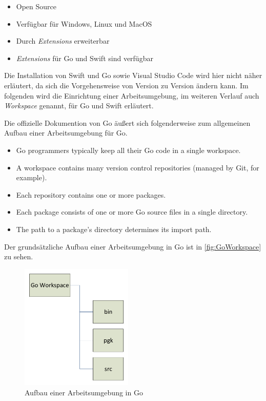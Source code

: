 \begin{itemize}
    \item Open Source
    \item Verfügbar für Windows, Linux und MacOS
    \item Durch \textit{Extensions} erweiterbar
    \item \textit{Extensions} für Go und Swift sind verfügbar
\end{itemize}

Die Installation von Swift und Go sowie Visual Studio Code wird hier nicht näher erläutert, da sich die Vorgehensweise von Version zu Version ändern kann.
Im folgenden wird die Einrichtung einer Arbeitsumgebung, im weiteren Verlauf auch \textit{Workspace} genannt, für Go und Swift erläutert.

Die offizielle Dokumention von Go \cite[]{GoDoc.Workspaces} äußert sich folgenderweise zum allgemeinen Aufbau einer Arbeitsumgebung für Go.

\begin{itemize}
    \item Go programmers typically keep all their Go code in a single workspace.
    \item \label{itm:GoWorkspaceSrc} A workspace contains many version control repositories (managed by Git, for example). 
    \item Each repository contains one or more packages.
    \item Each package consists of one or more Go source files in a single directory.
    \item The path to a package's directory determines its import path.
\end{itemize}

Der grundsätzliche Aufbau einer Arbeitsumgebung in Go ist in \autoref{fig:GoWorkspace} zu sehen. 

\begin{figure}[H]
    \centering
    \includegraphics[height=6cm]{Images/GoWorkspace}
    \caption{Aufbau einer Arbeitsumgebung in Go}
    \label{fig:GoWorkspace}
\end{figure}

